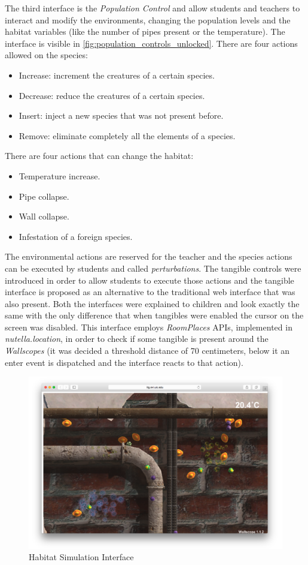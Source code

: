 The third interface is the \textit{Population Control} and allow students and teachers to interact and modify the environments, changing the population levels and the habitat variables (like the number of pipes present or the temperature). The interface is visible in \ref{fig:population_controls_unlocked}.
There are four actions allowed on the species:
\begin{itemize}
    \item Increase: increment the creatures of a certain species.
    \item Decrease: reduce the creatures of a certain species.
    \item Insert: inject a new species that was not present before.
    \item Remove: eliminate completely all the elements of a species.
\end{itemize}

There are four actions that can change the habitat:
\begin{itemize}
    \item Temperature increase.
    \item Pipe collapse.
    \item Wall collapse.
    \item Infestation of a foreign species.
\end{itemize}

The environmental actions are reserved for the teacher and the species actions can be executed by students and called \textit{perturbations}. The tangible controls were introduced in order to allow students to execute those actions and the tangible interface is proposed as an alternative to the traditional web interface that was also present. Both the interfaces were explained to children and look exactly the same with the only difference that when tangibles were enabled the cursor on the screen was disabled. This interface employs \textit{RoomPlaces} APIs, implemented in \textit{nutella.location}, in order to check if some tangible is present around the \textit{Wallscopes} (it was decided a threshold distance of 70 centimeters, below it an enter event is dispatched and the interface reacts to that action).

\begin{figure}
\centering
\includegraphics[width=5in]{images/ecosystem-1.png}
\caption{Habitat Simulation Interface}
\label{fig:ecosystem_1}
\end{figure}


